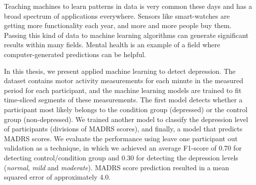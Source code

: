Teaching machines to learn patterns in data is very common these days and has a broad spectrum of applications everywhere. Sensors like smart-watches are getting more functionality each year, and more and more people buy them. Passing this kind of data to machine learning algorithms can generate significant results within many fields. Mental health is an example of a field where computer-generated predictions can be helpful.

In this thesis, we present applied machine learning to detect depression. The dataset contains motor activity measurements for each minute in the measured period for each participant, and the machine learning models are trained to fit time-sliced segments of these measurements. The first model detects whether a participant most likely belongs to the condition group (depressed) or the control group (non-depressed). We trained another model to classify the depression level of participants (divisions of MADRS scores), and finally, a model that predicts MADRS scores. We evaluate the performance using leave one participant out validation as a technique, in which we achieved an average F1-score of 0.70 for detecting control/condition group and 0.30 for detecting the depression levels (\emph{normal}, \emph{mild} and \emph{moderate}). MADRS score prediction resulted in a mean squared error of approximately 4.0.